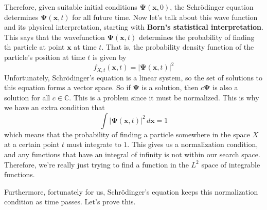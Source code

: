 \documentclass{article}
\theoremstyle{definition}
\begin{document}
    Therefore, given suitable initial conditions $\boldsymbol{\Psi}(\mathbf{x}, 0)$, the Schr\"odinger equation determines $\boldsymbol{\Psi}(\mathbf{x}, t)$ for all future time. Now let's talk about this wave function and its physical interpretation, starting with \textbf{Born's statistical interpretation}. This says that the wavefunction $\boldsymbol{\Psi}(\mathbf{x}, t)$ determines the probability of finding th particle at point $\mathbf{x}$ at time $t$. That is, the probability density function of the particle's position at time $t$ is given by 
    \begin{equation} 
      f_{X, t} (\mathbf{x}, t) = |\boldsymbol{\Psi}(\mathbf{x}, t)|^2
    \end{equation}
    Unfortunately, Schr\"odinger's equation is a linear system, so the set of solutions to this equation forms a vector space. So if $\boldsymbol{\Psi}$ is a solution, then $c \boldsymbol{\Psi}$ is also a solution for all $c \in \mathbb{C}$. This is a problem since it must be normalized. This is why we have an extra condition that 
    \begin{equation} 
    \int |\boldsymbol{\Psi}(\mathbf{x}, t)|^2 \,d \mathbf{x} = 1
    \end{equation}
    which means that the probability of finding a particle somewhere in the space $X$ at a certain point $t$ must integrate to $1$. This gives us a normalization condition, and any functions that have an integral of infinity is not within our search space. Therefore, we're really just trying to find a function in the $L^2$ space of integrable functions. 

    Furthermore, fortunately for us, Schr\"odinger's equation keeps this normalization condition as time passes. Let's prove this. 
\end{document}
